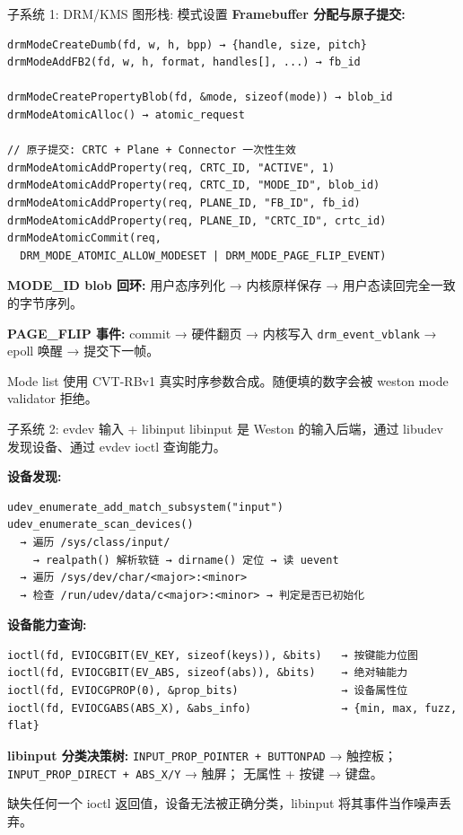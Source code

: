 \documentclass[aspectratio=169,10pt]{ctexbeamer}
\begin{document}

\begin{frame}[fragile,shrink=20]{子系统 1: DRM/KMS 图形栈: 模式设置}
\small
\textbf{Framebuffer 分配与原子提交:}

\begin{verbatim}
drmModeCreateDumb(fd, w, h, bpp) → {handle, size, pitch}
drmModeAddFB2(fd, w, h, format, handles[], ...) → fb_id

drmModeCreatePropertyBlob(fd, &mode, sizeof(mode)) → blob_id
drmModeAtomicAlloc() → atomic_request

// 原子提交: CRTC + Plane + Connector 一次性生效
drmModeAtomicAddProperty(req, CRTC_ID, "ACTIVE", 1)
drmModeAtomicAddProperty(req, CRTC_ID, "MODE_ID", blob_id)
drmModeAtomicAddProperty(req, PLANE_ID, "FB_ID", fb_id)
drmModeAtomicAddProperty(req, PLANE_ID, "CRTC_ID", crtc_id)
drmModeAtomicCommit(req,
  DRM_MODE_ATOMIC_ALLOW_MODESET | DRM_MODE_PAGE_FLIP_EVENT)
\end{verbatim}

\textbf{MODE\_ID blob 回环:} 用户态序列化 → 内核原样保存 → 用户态读回完全一致的字节序列。

\textbf{PAGE\_FLIP 事件:} commit → 硬件翻页 → 内核写入 \texttt{drm\_event\_vblank} → epoll 唤醒 → 提交下一帧。

Mode list 使用 CVT-RBv1 真实时序参数合成。随便填的数字会被 weston mode validator 拒绝。
\end{frame}


\begin{frame}[fragile,shrink=30]{子系统 2: evdev 输入 + libinput}
libinput 是 Weston 的输入后端，通过 libudev 发现设备、通过 evdev ioctl 查询能力。

\vspace{1mm}
\textbf{设备发现:}
\begin{verbatim}
udev_enumerate_add_match_subsystem("input")
udev_enumerate_scan_devices()
  → 遍历 /sys/class/input/
    → realpath() 解析软链 → dirname() 定位 → 读 uevent
  → 遍历 /sys/dev/char/<major>:<minor>
  → 检查 /run/udev/data/c<major>:<minor> → 判定是否已初始化
\end{verbatim}

\vspace{1mm}
\textbf{设备能力查询:}
\begin{verbatim}
ioctl(fd, EVIOCGBIT(EV_KEY, sizeof(keys)), &bits)   → 按键能力位图
ioctl(fd, EVIOCGBIT(EV_ABS, sizeof(abs)), &bits)    → 绝对轴能力
ioctl(fd, EVIOCGPROP(0), &prop_bits)                → 设备属性位
ioctl(fd, EVIOCGABS(ABS_X), &abs_info)              → {min, max, fuzz, flat}
\end{verbatim}

\textbf{libinput 分类决策树:}
\texttt{INPUT\_PROP\_POINTER + BUTTONPAD} → 触控板；
\texttt{INPUT\_PROP\_DIRECT + ABS\_X/Y} → 触屏；
无属性 + 按键 → 键盘。

缺失任何一个 ioctl 返回值，设备无法被正确分类，libinput 将其事件当作噪声丢弃。
\end{frame}
\end{document}
